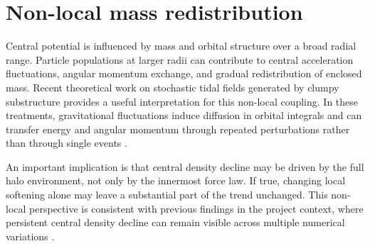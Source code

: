 \section{Non-local mass redistribution}
\label{sec:bg_shells}

Central potential is influenced by mass and orbital structure over a broad radial range. Particle populations at larger radii can contribute to central acceleration fluctuations, angular momentum exchange, and gradual redistribution of enclosed mass. Recent theoretical work on stochastic tidal fields generated by clumpy substructure provides a useful interpretation for this non-local coupling. In these treatments, gravitational fluctuations induce diffusion in orbital integrals and can transfer energy and angular momentum through repeated perturbations rather than through single events \citep{penarrubia2019stochastic,penarrubia2017fluctuations}.

An important implication is that central density decline may be driven by the full halo environment, not only by the innermost force law. If true, changing local softening alone may leave a substantial part of the trend unchanged. This non-local perspective is consistent with previous findings in the project context, where persistent central density decline can remain visible across multiple numerical variations \citep{salamin2026origin}.